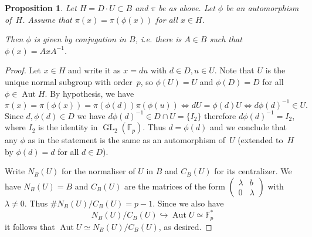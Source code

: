 \documentclass[12pt, reqno]{amsart}
\newcommand{\F}{\mathbb{F}}
\DeclareMathOperator{\Aut}{Aut}
\newcommand{\GL}{\operatorname{GL}}
\numberwithin{equation}{section}
\newtheorem{proposition}[theorem]{Proposition}
\theoremstyle{definition}
\theoremstyle{remark}
\begin{document}
\begin{proposition} \label{P:inner}
Let $H = D \cdot U \subset B$ and $\pi$ be as above. 
Let $\phi$ be an automorphism of~$H$. Assume that  
$\pi(x) = \pi(\phi(x))$ for all $x \in H$. 

Then $\phi$ is given by conjugation in $B$, i.e. there is $A \in B$ such that $\phi(x) = AxA^{-1}$. 
\end{proposition}
\begin{proof}
Let $x \in H$ and write it as $x = du$ with $d \in D, u \in U$.
Note that $U$ is the unique normal subgroup with order~$p$, so 
$\phi(U) = U$ and $\phi(D)=D$ for all $\phi \in \Aut H$.
By hypothesis, we have 
\[
 \pi(x) = \pi(\phi(x)) = \pi(\phi(d))\pi(\phi(u)) \iff dU = \phi(d)U
 \iff d\phi(d)^{-1} \in U.
\]
Since $d, \phi(d) \in D$ we have $d\phi(d)^{-1} \in D \cap U = \{ I_2\}$ therefore $d\phi(d)^{-1} = I_2$, where $I_2$ is the identity in $\GL_2(\F_p)$.
Thus $d = \phi(d)$ and we conclude that any $\phi$ 
as in the statement is the same as an automorphism of~$U$ (extended to~$H$ by $\phi(d)=d$ for all $d\in D$). 

Write $N_B(U)$  for the normaliser of $U$ in $B$ and $C_B(U)$ for its centralizer. 
We have $N_B(U) = B$ 
and $C_B(U)$ are the matrices of the form $\left(\begin{smallmatrix}
                            \lambda & b \\
                            0 & \lambda
                            \end{smallmatrix} \right)$
with $\lambda \neq 0$. Thus $\# N_B(U)/C_B(U) = p-1$. 
Since  we also have 
\[
 N_B(U)/C_B(U) \hookrightarrow \Aut U \simeq \F_p^*
\]
it follows that $\Aut U \simeq N_B(U)/C_B(U)$, as desired.
\end{proof}
\end{document}
